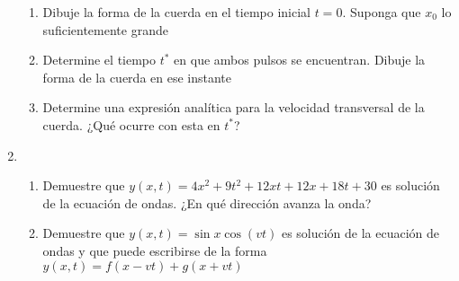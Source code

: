 \documentclass[letterpaper,11pt]{article}
\begin{document}
\begin{enumerate}
\begin{enumerate}
    \item Dibuje la forma de la cuerda en el tiempo inicial $t=0$. Suponga que $x_0$ lo suficientemente grande

    \item Determine el tiempo $t^*$ en que ambos pulsos se encuentran. Dibuje la forma de la cuerda en ese instante

    \item Determine una expresión analítica para la velocidad transversal de la cuerda. ¿Qué ocurre con esta en $t^*$?
\end{enumerate}


\item
\begin{enumerate}
    \item Demuestre que $y(x,t) = 4x^2 + 9 t^2 + 12xt + 12x + 18t + 30$ es solución de la ecuación de ondas. ¿En qué dirección avanza la onda?

    \item Demuestre que $y(x,t) = \sin{x}\cos{(vt)}$ es solución de la ecuación de ondas y que puede escribirse de la forma $y(x,t) = f(x-vt)+g(x+vt)$
\end{enumerate}


%   

\end{enumerate}
\end{document}
